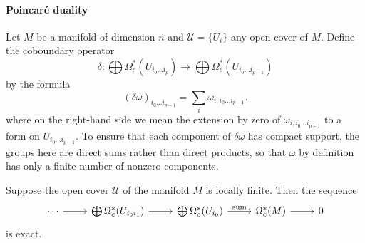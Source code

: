 \paragraph{Poincar\'e duality}
Let $M$ be a manifold of dimension $n$ and $\mathcal{U}=\{U_i\}$ any open cover of $M$. Define the coboundary operator
\[\delta:\bigoplus\Omega^*_c(U_{i_0\dots i_p})\to\bigoplus\Omega^*_c(U_{i_0\dots i_{p-1}})\]
by the formula
\[(\delta\omega)_{i_0\dots i_{p-1}}=\sum_{i}\omega_{i,i_0\dots i_{p-1}}.\]
where on the right-hand side we mean the extension by zero of $\omega_{i,i_0\dots i_{p-1}}$ to a form on $U_{i_0\dots i_{p-1}}$. To ensure that each component of $\delta\omega$ 
has compact support, the groups here are direct sums rather than direct products, so that $\omega$ by definition has only a finite number of nonzero components.
\begin{proposition}\label{Generalized MV compact supp}
Suppose the open cover $\mathcal{U}$ of the manifold $M$ is locally finite. Then the sequence
\[\begin{tikzcd}
\cdots\ar[r]&\bigoplus\Omega^*_c(U_{i_0i_1})\ar[r]&\bigoplus\Omega^*_c(U_{i_0})\ar[r,"\text{sum}"]&\Omega^*_c(M)\ar[r]&0
\end{tikzcd}\]
is exact.
\end{proposition}
